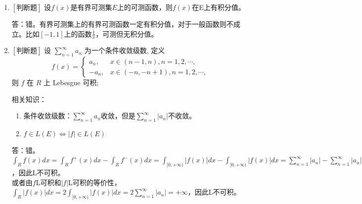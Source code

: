 \documentclass{article}
\begin{document}
\begin{enumerate}
     \begin{minipage}[t]{0.45\linewidth}
    (A) $f$ $R$ 上 Lebesgue 可积
    \end{minipage}
    \hfill
    \begin{minipage}[t]{0.45\linewidth}
    (B) $f$在 $R$ 上 Lebesgue 不可积，但有积分值
    \end{minipage}
    \begin{minipage}[t]{0.45\linewidth}
    (C) $\left|f\right|$在 $R$ 上 Lebesgue 不可积，且无积分值
    \end{minipage}
    \hfill
    \begin{minipage}[t]{0.45\linewidth}
    (D) $\left|f\right|$在 $R$ 上 Lebesgue 不可积，但有积分值
    \end{minipage}

    \item $\left[\textbf{判断题}\right]$ 设$f(x)$是有界可测集$E$上的可测函数，则$f(x)$在E上有积分值。
    
    答：错。有界可测集上的有界可测函数一定有积分值，对于一般函数则不成立。比如$[-1, 1]$上的函数$\frac{1}{x}$，可测但无积分值。
    
    
    \item $\left[\textbf{判断题}\right]$ 设 $\sum_{n=1}^{\infty} a_n$ 为一个条件收敛级数, 定义
    $$
    f(x)=\left\{\begin{array}{lc}
    a_n, & x \in(n-1, n), n=1,2, \cdots, \\
    -a_n, & x \in(-n,-n+1), n=1,2, \cdots,
    \end{array}\right.
    $$
    则 $f$ 在 $R$ 上 Lebesgue 可积;
    
    相关知识：
    \begin{enumerate}
        \item 条件收敛级数：$\sum_{n=1}^{\infty} a_n$收敛，但是$\sum_{n=1}^{\infty} |a_n|$不收敛。
        \item $f \in L(E) \Leftrightarrow |f| \in L(E)$
    \end{enumerate}

    答：错。\\
    $\int_{R} f(x) dx=\int_{R} f^{+}(x) dx - \int_{R} f^{-}(x) dx=\int_{[0, +\infty)} |f(x)| dx - \int_{[0, +\infty)} |f(x)| dx=\sum_{n=1}^{\infty} |a_n| - \sum_{n=1}^{\infty} |a_n|=\infty - \infty$，因此L不可积。\\
    或者由$f$L可积和$|f|$L可积的等价性，$\int_{R} |f(x)| dx=2\int_{[0, +\infty)} |f(x)| dx=2\sum_{n=1}^{\infty} |a_n|=+\infty$，因此L不可积。


\end{enumerate}
\end{document}
